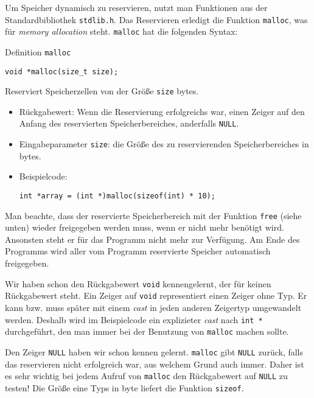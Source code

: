 Um Speicher dynamisch zu reservieren, nutzt man Funktionen aus der Standardbibliothek \verb|stdlib.h|.
Das Reservieren erledigt die Funktion \verb|malloc|, was für \emph{memory allocation} steht.
\verb|malloc| hat die folgenden Syntax:
\begin{myexampleblock}{Definition \texttt{malloc}}
  \begin{lstlisting}
void *malloc(size_t size);
  \end{lstlisting}
  \vspace{-0.7cm}
  Reserviert Speicherzellen von der Größe \verb|size| bytes.
  \begin{itemize}
    \itemsep0.2pt
  \item Rückgabewert: Wenn die Reservierung erfolgreichs war, einen Zeiger auf den Anfang des
    reservierten Speicherbereiches, anderfalls \verb|NULL|.
  \item Eingabeparameter \verb|size|: die Größe des zu reservierenden Speicherbereiches in bytes.
  \item Beispielcode:
    \begin{lstlisting}
int *array = (int *)malloc(sizeof(int) * 10);
    \end{lstlisting}
  \end{itemize}
  \vspace{-0.7cm}
  Man beachte, dass der reservierte Speicherbereich mit der Funktion \verb|free| (siehe unten) wieder freigegeben werden muss, wenn er nicht mehr benötigt wird. 
  Ansonsten steht er für das Programm nicht mehr zur Verfügung.
  Am Ende des Programms wird aller vom Programm reservierte Speicher automatisch freigegeben.
\end{myexampleblock}
Wir haben schon den Rückgabewert \verb|void| kennengelernt, der für keinen Rückgabewert steht.
Ein Zeiger auf \verb|void| representiert einen Zeiger ohne Typ.
Er kann bzw. muss später mit einem \emph{cast} in jeden anderen Zeigertyp umgewandelt werden.
Deshalb wird im Beispielcode ein explizieter \emph{cast} nach \verb|int *| durchgeführt, den man immer bei der Benutzung von \verb|malloc| machen sollte.

Den Zeiger \verb|NULL| haben wir schon kennen gelernt. 
\verb|malloc| gibt \verb|NULL| zurück, falls das reservieren nicht erfolgreich war, aus welchem Grund auch immer.
Daher ist es sehr wichtig bei jedem Aufruf von \verb|malloc| den Rückgabewert auf \verb|NULL| zu testen!
Die Größe eine Typs in byte liefert die Funktion \verb|sizeof|.

